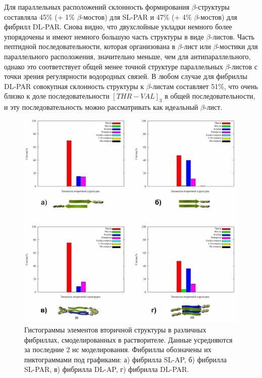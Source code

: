     Для параллельных расположений склонность формирования $\beta$-структуры составляла 45\% (+ 1\% $\beta$-мостов) для SL-PAR и 47\% (+ 4\% $\beta$-мостов) для фибрилл DL-PAR. Снова видно, что двухслойные укладки немного более упорядочены и имеют немного большую часть структуры в виде $\beta$-листов. Часть пептидной последовательности, которая организована в $\beta$-лист или $\beta$-мостики для параллельного расположения, значительно меньше, чем для антипараллельного, однако это соответствует общей менее точной структуре параллельных $\beta$-листов с точки зрения регулярности водородных связей. В любом случае для фибриллы DL-PAR совокупная склонность структуры к $\beta$-листам составляет 51\%, что очень близко к доле последовательности $[THR-VAL]_3$ в общей последовательности, и эту последовательность можно рассматривать как идеальный $\beta$-лист.

\begin{figure} [H]
    \centering
    \includegraphics[width=\textwidth]{images/p4/punkt5/part4_p5_f39.pdf}
    \caption[Гистограммы элементов вторичной структуры в различных фибриллах, смоделированных в растворителе]{Гистограммы элементов вторичной структуры в различных фибриллах, смоделированных в растворителе. Данные усредняются за последние 2 нс моделирования. Фибриллы обозначены их пиктограммами под графиками: а) фибрилла SL-AP, б) фибрилла SL-PAR, в) фибрилла DL-AP, г) фибрилла DL-PAR.}
    \label{fig:p4_p5_f39}
\end{figure}

